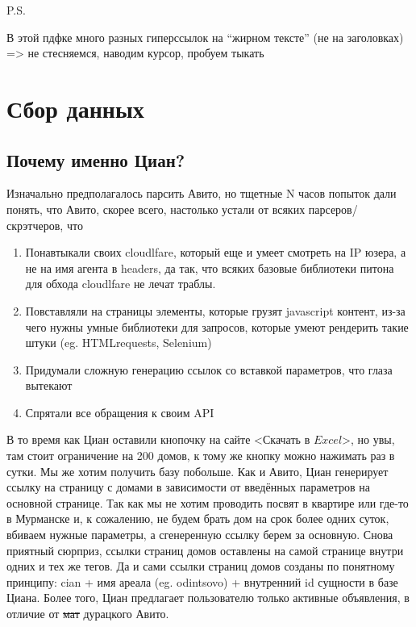 \documentclass{article}
\begin{document}
P.S.


В этой пдфке много разных гиперссылок на “жирном тексте” (не на заголовках) => не стесняемся, наводим курсор, пробуем тыкать



\newpage

\section{Сбор данных}

\subsection{Почему именно Циан?}

Изначально предполагалось парсить Авито, но тщетные N часов попыток дали понять, что Авито, скорее всего, настолько устали от всяких парсеров/скрэтчеров, что
\begin{enumerate}
    \item Понавтыкали своих cloudlfare, который еще и умеет смотреть на IP юзера, а не на имя агента в headers, да так, что всяких базовые библиотеки питона для обхода cloudlfare не лечат траблы.
    \item Повставляли на страницы элементы, которые грузят javascript контент, из-за чего нужны умные библиотеки для запросов, которые умеют рендерить такие штуки (eg. HTMLrequests, Selenium)
    \item Придумали сложную генерацию ссылок со вставкой параметров, что глаза вытекают
    \item Спрятали все обращения к своим API
\end{enumerate}


В то время как Циан оставили кнопочку на сайте <Скачать в $Excel$>, но увы, там стоит ограничение на 200 домов, к тому же кнопку можно нажимать раз в сутки. Мы же хотим получить базу побольше.
Как и Авито, Циан генерирует ссылку на страницу с домами в зависимости от введённых параметров на основной странице. Так как мы не хотим проводить посвят в квартире или где-то в Мурманске и, к сожалению, не будем брать дом на срок более одних суток, вбиваем нужные параметры, а сгенеренную ссылку берем за основную. Снова приятный сюрприз, ссылки страниц домов оставлены на самой странице внутри одних и тех же тегов. Да и сами ссылки страниц домов созданы по понятному принципу: cian + имя ареала (eg. odintsovo) + внутренний id сущности в базе Циана. Более того, Циан предлагает пользователю только активные объявления, в отличие от \sout{мат} дурацкого Авито.
\end{document}
